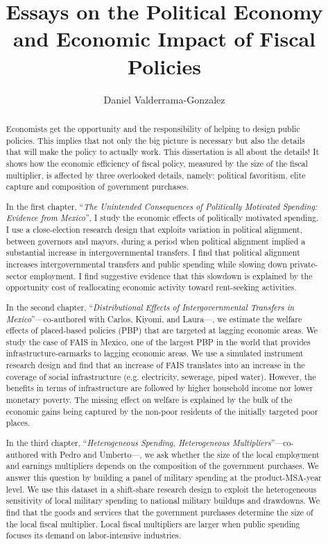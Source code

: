 \documentclass[12pt]{report}
\title{Essays on the Political Economy and Economic Impact of Fiscal Policies}
\author{Daniel Valderrama-Gonzalez}
\begin{document}

\maketitle   

\begin{abstract}
Economists get the opportunity and the responsibility of helping to design public policies. This implies that not only the big picture is necessary but also the details that will make the policy to actually work. This dissertation is all about the details! It shows how the economic efficiency of fiscal policy, measured by the size of the fiscal multiplier, is affected by three overlooked details, namely: political favoritism, elite capture and composition of government purchases. 

In the first chapter, \enquote{\textit{The Unintended Consequences of Politically Motivated Spending: Evidence from Mexico}}, I study the economic effects of politically motivated spending. I use a close-election research design that exploits variation in political alignment, between governors and mayors, during a period when political alignment implied a substantial increase in intergovernmental transfers. I find that political alignment increases intergovernmental transfers and public spending while slowing down private-sector employment. I find suggestive evidence that this slowdown is explained by the opportunity cost of reallocating economic activity toward rent-seeking activities. 

In the second chapter, \enquote{\textit{Distributional Effects of Intergovernmental Transfers in Mexico}}---co-authored with Carlos, Kiyomi, and Laura---,
we estimate the welfare effects of placed-based policies (PBP) that are targeted at lagging economic areas. We study the case of FAIS in Mexico, one of the largest PBP in the world that provides infrastructure-earmarks to lagging economic areas. We use a simulated instrument research design and find that an increase of FAIS translates into an increase in the coverage of social infrastructure (e.g. electricity, sewerage, piped water). However, the benefits in terms of infrastructure are followed by higher household income nor lower monetary poverty. The missing effect on welfare is explained by the bulk of the economic gains being captured by the non-poor residents of the initially targeted poor places.

In the third chapter, \enquote{\textit{Heterogeneous Spending, Heterogeneous Multipliers}}---co-authored with Pedro and Umberto---, we ask whether the size of the local employment and earnings multipliers depends on the composition of the government purchases. We answer this question by building a panel of military spending at the product-MSA-year level. We use this dataset in a shift-share research design to exploit the heterogeneous sensitivity of local military spending to national military buildups and drawdowns. We find that the goods and services that the government purchases determine the size of the local fiscal multiplier. Local fiscal multipliers are larger when public spending focuses its demand on labor-intensive industries.


\end{abstract}
\end{document}
